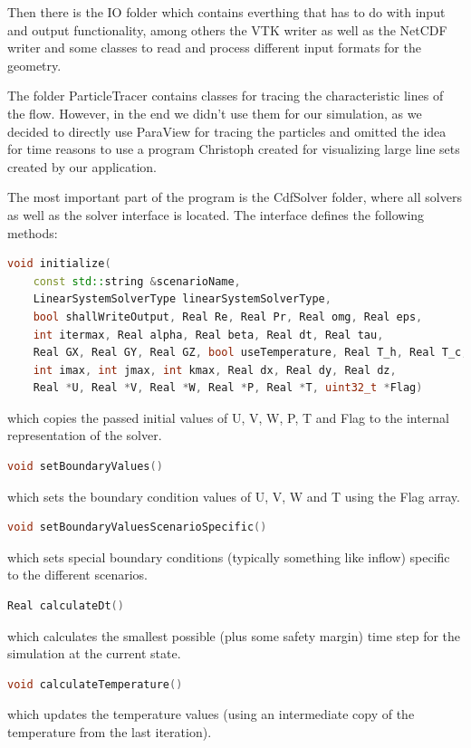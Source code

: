 \documentclass{article}%
\begin{document}
Then there is the IO folder which contains everthing that has to do with input and output functionality, among others the VTK writer as well as the NetCDF writer and some classes to read and process different input formats for the geometry.

The folder ParticleTracer contains classes for tracing the characteristic lines of the flow. However, in the end we didn't use them for our simulation, as we decided to directly use ParaView for tracing the particles and omitted the idea for time reasons to use a program Christoph created for visualizing large line sets created by our application.

The most important part of the program is the CdfSolver folder, where all solvers as well as the solver interface is located. The interface defines the following methods:

\begin{lstlisting}[language=C++,frame=single]
void initialize(
    const std::string &scenarioName,
    LinearSystemSolverType linearSystemSolverType,
    bool shallWriteOutput, Real Re, Real Pr, Real omg, Real eps,
    int itermax, Real alpha, Real beta, Real dt, Real tau,
    Real GX, Real GY, Real GZ, bool useTemperature, Real T_h, Real T_c,
    int imax, int jmax, int kmax, Real dx, Real dy, Real dz,
    Real *U, Real *V, Real *W, Real *P, Real *T, uint32_t *Flag)
\end{lstlisting}
which copies the passed initial values of U, V, W, P, T and Flag to the internal representation of the solver.

\begin{lstlisting}[language=C++,frame=single]
void setBoundaryValues()
\end{lstlisting}
which sets the boundary condition values of U, V, W and T using the Flag array.

\begin{lstlisting}[language=C++,frame=single]
void setBoundaryValuesScenarioSpecific()
\end{lstlisting}
which sets special boundary conditions (typically something like inflow) specific to the different scenarios.

\begin{lstlisting}[language=C++,frame=single]
Real calculateDt()
\end{lstlisting}
which calculates the smallest possible (plus some safety margin) time step for the simulation at the current state.

\begin{lstlisting}[language=C++,frame=single]
void calculateTemperature()
\end{lstlisting}
which updates the temperature values (using an intermediate copy of the temperature from the last iteration).
\end{document}
